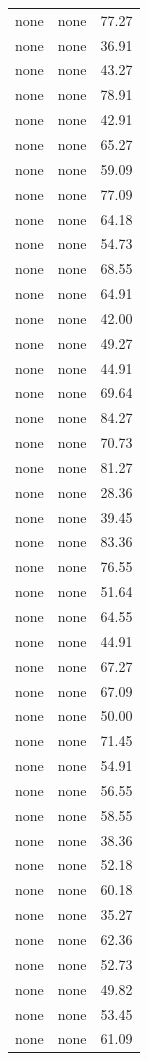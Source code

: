 \begin{tabular}{rrr}
none & none & 77.27 \\
none & none & 36.91 \\
none & none & 43.27 \\
none & none & 78.91 \\
none & none & 42.91 \\
none & none & 65.27 \\
none & none & 59.09 \\
none & none & 77.09 \\
none & none & 64.18 \\
none & none & 54.73 \\
none & none & 68.55 \\
none & none & 64.91 \\
none & none & 42.00 \\
none & none & 49.27 \\
none & none & 44.91 \\
none & none & 69.64 \\
none & none & 84.27 \\
none & none & 70.73 \\
none & none & 81.27 \\
none & none & 28.36 \\
none & none & 39.45 \\
none & none & 83.36 \\
none & none & 76.55 \\
none & none & 51.64 \\
none & none & 64.55 \\
none & none & 44.91 \\
none & none & 67.27 \\
none & none & 67.09 \\
none & none & 50.00 \\
none & none & 71.45 \\
none & none & 54.91 \\
none & none & 56.55 \\
none & none & 58.55 \\
none & none & 38.36 \\
none & none & 52.18 \\
none & none & 60.18 \\
none & none & 35.27 \\
none & none & 62.36 \\
none & none & 52.73 \\
none & none & 49.82 \\
none & none & 53.45 \\
none & none & 61.09 \\

\end{tabular}
